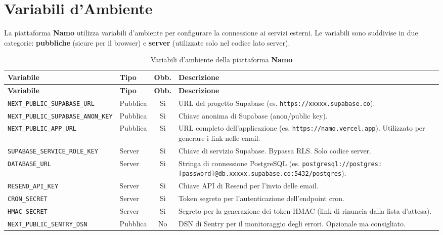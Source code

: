 \documentclass[a4paper,11pt,oneside]{book}
\newcommand{\namo}{\textbf{Namo}}
\begin{document}
\section{Variabili d'Ambiente}
\label{sec:variabili-ambiente}

La piattaforma \namo{} utilizza variabili d'ambiente per configurare la connessione ai servizi esterni. Le variabili sono suddivise in due categorie: \textbf{pubbliche} (sicure per il browser) e \textbf{server} (utilizzate solo nel codice lato server).

\begin{longtable}{p{5.5cm} l c p{5cm}}
\caption{Variabili d'ambiente della piattaforma \namo{}} \label{tab:variabili-ambiente} \\
\toprule
\textbf{Variabile} & \textbf{Tipo} & \textbf{Obb.} & \textbf{Descrizione} \\
\midrule
\endfirsthead
\toprule
\textbf{Variabile} & \textbf{Tipo} & \textbf{Obb.} & \textbf{Descrizione} \\
\midrule
\endhead
\texttt{NEXT\_PUBLIC\_SUPABASE\_URL}   & Pubblica & S\`i & URL del progetto Supabase (es. \texttt{https://xxxxx.supabase.co}). \\[4pt]
\texttt{NEXT\_PUBLIC\_SUPABASE\_ANON\_KEY} & Pubblica & S\`i & Chiave anonima di Supabase (anon/public key). \\[4pt]
\texttt{NEXT\_PUBLIC\_APP\_URL}        & Pubblica & S\`i & URL completo dell'applicazione (es. \texttt{https://namo.vercel.app}). Utilizzato per generare i link nelle email. \\[4pt]
\texttt{SUPABASE\_SERVICE\_ROLE\_KEY}  & Server   & S\`i & Chiave di servizio Supabase. Bypassa RLS. Solo codice server. \\[4pt]
\texttt{DATABASE\_URL}                 & Server   & S\`i & Stringa di connessione PostgreSQL (es. \texttt{postgresql://postgres:[password]@db.xxxxx.supabase.co:5432/postgres}). \\[4pt]
\texttt{RESEND\_API\_KEY}              & Server   & S\`i & Chiave API di Resend per l'invio delle email. \\[4pt]
\texttt{CRON\_SECRET}                  & Server   & S\`i & Token segreto per l'autenticazione dell'endpoint cron. \\[4pt]
\texttt{HMAC\_SECRET}                  & Server   & S\`i & Segreto per la generazione dei token HMAC (link di rinuncia dalla lista d'attesa). \\[4pt]
\texttt{NEXT\_PUBLIC\_SENTRY\_DSN}     & Pubblica & No  & DSN di Sentry per il monitoraggio degli errori. Opzionale ma consigliato. \\
\bottomrule
\end{longtable}
\end{document}
